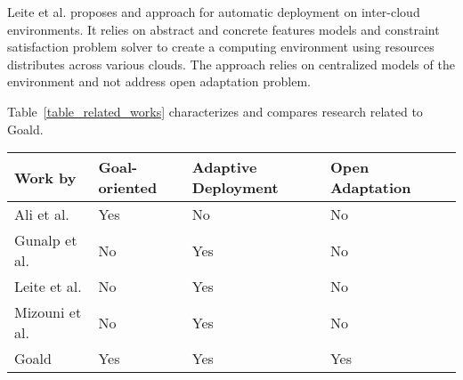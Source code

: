 
Leite et al. \cite{ferreira_leite_user_2014} proposes and approach for automatic deployment on inter-cloud environments. It relies on abstract and concrete features models and constraint satisfaction problem solver to create a computing environment using resources distributes across various clouds. The approach relies on centralized models of the environment and not address open adaptation problem.


Table~\ref{table_related_works} characterizes and compares research related to Goald.

\begin{table*}[]
\centering
\caption{Comparing characteristic properties of selected approaches related to Goald}
\label{table_related_works}
\begin{tabular}{|l|l|l|l|l|}
\hline
 \textbf{Work by} & \textbf{Goal-oriented} & \textbf{Adaptive Deployment} &  \textbf{Open Adaptation} \\ \hline
Ali et al.\citep{ali_requirements-driven_2014} & Yes & No & No \\ \hline
Gunalp et al.\citep{gunalp_rondo_2015} & No & Yes  &  No\\ \hline
Leite et al. \citep{ferreira_leite_user_2014}  & No & Yes & No \\ \hline
Mizouni et al. \citep{mizouni_framework_2014} & No & Yes & No \\ \hline
Goald & Yes & Yes & Yes \\ \hline
\end{tabular}
\end{table*}
